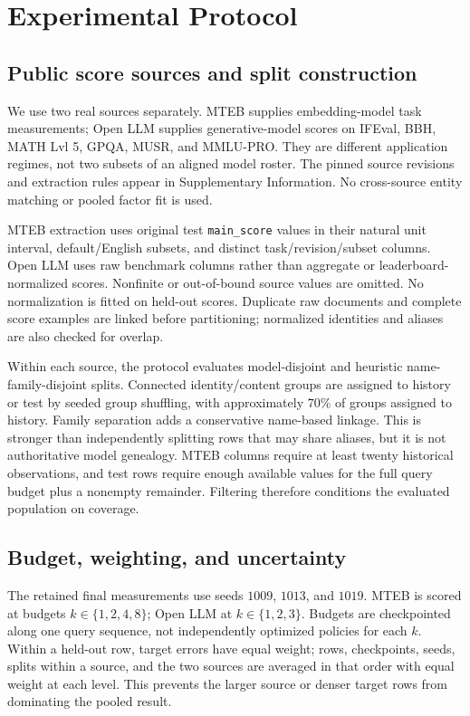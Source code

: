 \documentclass{article}
\begin{document}
\section{Experimental Protocol}
\subsection{Public score sources and split construction}
We use two real sources separately. MTEB supplies embedding-model task measurements; Open LLM supplies generative-model scores on IFEval, BBH, MATH Lvl 5, GPQA, MUSR, and MMLU-PRO. They are different application regimes, not two subsets of an aligned model roster. The pinned source revisions and extraction rules appear in Supplementary Information. No cross-source entity matching or pooled factor fit is used.

MTEB extraction uses original test \texttt{main\_score} values in their natural unit interval, default/English subsets, and distinct task/revision/subset columns. Open LLM uses raw benchmark columns rather than aggregate or leaderboard-normalized scores. Nonfinite or out-of-bound source values are omitted. No normalization is fitted on held-out scores. Duplicate raw documents and complete score examples are linked before partitioning; normalized identities and aliases are also checked for overlap.

Within each source, the protocol evaluates model-disjoint and heuristic name-family-disjoint splits. Connected identity/content groups are assigned to history or test by seeded group shuffling, with approximately $70\%$ of groups assigned to history. Family separation adds a conservative name-based linkage. This is stronger than independently splitting rows that may share aliases, but it is not authoritative model genealogy. MTEB columns require at least twenty historical observations, and test rows require enough available values for the full query budget plus a nonempty remainder. Filtering therefore conditions the evaluated population on coverage.

\subsection{Budget, weighting, and uncertainty}
The retained final measurements use seeds $1009$, $1013$, and $1019$. MTEB is scored at budgets $k\in\{1,2,4,8\}$; Open LLM at $k\in\{1,2,3\}$. Budgets are checkpointed along one query sequence, not independently optimized policies for each $k$. Within a held-out row, target errors have equal weight; rows, checkpoints, seeds, splits within a source, and the two sources are averaged in that order with equal weight at each level. This prevents the larger source or denser target rows from dominating the pooled result.
\end{document}
